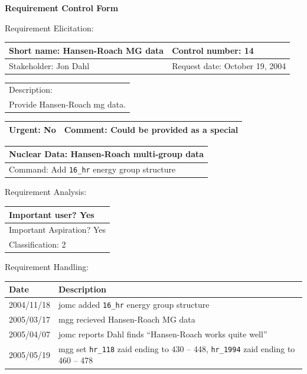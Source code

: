 \begin{center}\Large\bf
Requirement Control Form
\end{center}
\vspace{24pt}

Requirement Elicitation:

\begin{tabular}{|p{211pt}|p{211pt}|} \hline
Short name: Hansen-Roach MG data & Control number: 14\\ \hline
Stakeholder: Jon Dahl & Request date: October 19, 2004\\
\end{tabular}
\begin{tabular}{|p{433pt}|} \hline
Description: \\ 
Provide Hansen-Roach mg data. \\
\hline
\end{tabular} 
\begin{tabular}{|p{211pt}|p{211pt}|} \hline
Urgent: No & Comment: Could be provided as a special  \\ \hline
\end{tabular}

\vspace{12pt}

\begin{tabular}{|p{433pt}|} \hline
Nuclear Data: Hansen-Roach multi-group data \\ \hline
Command: Add \texttt{16\_hr} energy group structure \\ \hline
\end{tabular}
\vspace{24pt}

Requirement Analysis:

\begin{tabular}{|p{433pt}|} \hline
Important user? Yes \\ \hline
Important Aspiration? Yes \\ \hline
Classification: 2 \\ \hline
\end{tabular}
\vspace{24pt}

Requirement Handling:

\begin{tabular}{|p{72pt}|p{351pt}|} \hline
Date & Description \\ \hline
2004/11/18 & jomc added \texttt{16\_hr} energy group structure \\ \hline
2005/03/17 & mgg recieved Hansen-Roach MG data \\ \hline
2005/04/07 & jomc reports Dahl finds ``Hansen-Roach works quite well''
\\ \hline
2005/05/19 & mgg set \texttt{hr\_118} zaid ending to 430 -- 448,
\texttt{hr\_1994}  zaid ending to 460 -- 478 \\ \hline
\end{tabular}
\vspace{24pt}

